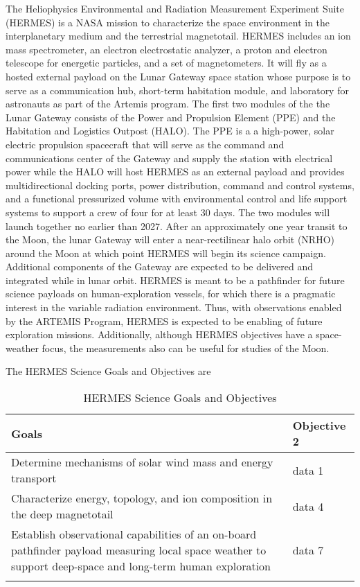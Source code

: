 The Heliophysics Environmental and Radiation Measurement Experiment Suite (HERMES) is a NASA mission to characterize the space environment in the interplanetary medium and the terrestrial magnetotail.
HERMES includes an ion mass spectrometer, an electron electrostatic analyzer, a proton and electron telescope for energetic particles, and a set of magnetometers.
It will fly as a hosted external payload on the Lunar Gateway space station whose purpose is to serve as a communication hub, short-term habitation module, and laboratory for astronauts as part of the Artemis program.
The first two modules of the the Lunar Gateway consists of the Power and Propulsion Element (PPE) and the Habitation and Logistics Outpost (HALO).
The PPE is a a high-power, solar electric propulsion spacecraft that will serve as the command and communications center of the Gateway and supply the station with electrical power while the HALO will host HERMES as an external payload and provides multidirectional docking ports, power distribution, command and control systems, and a functional pressurized volume with environmental control and life support systems to support a crew of four for at least 30 days.
The two modules will launch together no earlier than 2027.
After an approximately one year transit to the Moon, the lunar Gateway will enter a near-rectilinear halo orbit (NRHO) around the Moon at which point HERMES will begin its science campaign.
Additional components of the Gateway are expected to be delivered and integrated while in lunar orbit.
HERMES is meant to be a pathfinder for future science payloads on human-exploration vessels, for which there is a pragmatic interest in the variable radiation environment.
Thus, with observations enabled by the ARTEMIS Program, HERMES is expected to be enabling of future exploration missions.
Additionally, although HERMES objectives have a space-weather focus, the measurements also can be useful for studies of the Moon.

The HERMES Science Goals and Objectives are

\begin{table}[h]
\caption{HERMES Science Goals and Objectives}\label{table_hermes_stm}%
\begin{tabular}{@{}ll@{}}
\toprule
Goals & Objective 2 \\
\midrule
Determine mechanisms of solar wind mass and energy transport    & data 1    \\
Characterize energy, topology, and ion composition in the deep magnetotail    & data 4    \\
Establish observational capabilities of an on-board pathfinder payload measuring local space weather to support deep-space and long-term human exploration    & data 7    \\
\botrule
\end{tabular}
\end{table}

